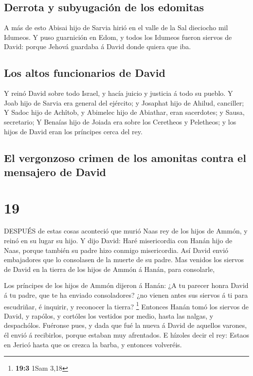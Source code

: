 \hypertarget{derrota-y-subyugaciuxf3n-de-los-edomitas}{%
\subsection{Derrota y subyugación de los
edomitas}\label{derrota-y-subyugaciuxf3n-de-los-edomitas}}

 A más de esto Abisai hijo de Sarvia hirió en el valle de
la Sal dieciocho mil Idumeos.  Y puso guarnición en Edom, y
todos los Idumeos fueron siervos de David: porque Jehová guardaba á
David donde quiera que iba.

\hypertarget{los-altos-funcionarios-de-david}{%
\subsection{Los altos funcionarios de
David}\label{los-altos-funcionarios-de-david}}

 Y reinó David sobre todo Israel, y hacía juicio y justicia
á todo su pueblo.  Y Joab hijo de Sarvia era general del
ejército; y Josaphat hijo de Ahilud, canciller;  Y Sadoc
hijo de Achîtob, y Abimelec hijo de Abiathar, eran sacerdotes; y Sausa,
secretario;  Y Benaías hijo de Joiada era sobre los
Ceretheos y Peletheos; y los hijos de David eran los príncipes cerca del
rey.

\hypertarget{el-vergonzoso-crimen-de-los-amonitas-contra-el-mensajero-de-david}{%
\subsection{El vergonzoso crimen de los amonitas contra el mensajero de
David}\label{el-vergonzoso-crimen-de-los-amonitas-contra-el-mensajero-de-david}}

\hypertarget{section-18}{%
\section{19}\label{section-18}}

 DESPUÉS de estas cosas aconteció que murió Naas rey de los
hijos de Ammón, y reinó en su lugar su hijo.  Y dijo David:
Haré misericordia con Hanán hijo de Naas, porque también su padre hizo
conmigo misericordia. Así David envió embajadores que lo consolasen de
la muerte de su padre. Mas venidos los siervos de David en la tierra de
los hijos de Ammón á Hanán, para consolarle,

 Los príncipes de los hijos de Ammón dijeron á Hanán: ¿A tu
parecer honra David á tu padre, que te ha enviado consoladores? ¿no
vienen antes sus siervos á ti para escudriñar, é inquirir, y reconocer
la tierra? \footnote{\textbf{19:3} 1Sam 3,18}  Entonces
Hanán tomó los siervos de David, y rapólos, y cortóles los vestidos por
medio, hasta las nalgas, y despachólos.  Fuéronse pues, y
dada que fué la nueva á David de aquellos varones, él envió á
recibirlos, porque estaban muy afrentados. E hízoles decir el rey:
Estaos en Jericó hasta que os crezca la barba, y entonces volveréis.

